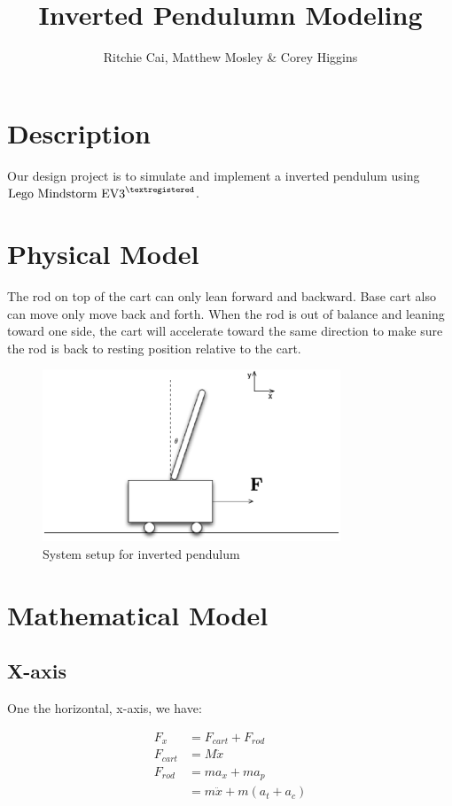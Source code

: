 \documentclass{notes}
\author{Ritchie Cai, Matthew Mosley \& Corey Higgins}
\title{Inverted Pendulumn Modeling}
\begin{document}
\maketitle 

\section{Description}
Our design project is to simulate and implement a inverted pendulum using 
$\text{Lego Mindstorm EV3}^{\textregistered}$. 

\section{Physical Model}

The rod on top of the cart can only lean forward and backward. 
Base cart also can move only move back and forth. 
When the rod is out of balance and leaning toward one side, the cart will accelerate toward the same
direction to make sure the rod is back to resting position relative to the cart.

\begin{figure}[!h]
  \begin{center}
    \includegraphics[width=3.5in]{pics/full_system.eps}
  \end{center}
  \caption{System setup for inverted pendulum}
  \label{fig:full_system}
\end{figure}


\section{Mathematical Model}



\subsection{X-axis}
One the horizontal, x-axis, we have:

\begin{align*}
  F_x & = F_{cart} + F_{rod} \\
  F_{cart} & = M\ddot{x}  \\
  F_{rod}  & = m a_x + m a_{p} \\
          & = m \ddot{x} + m (a_{t} + a_{c})
\end{align*}
\end{document}
